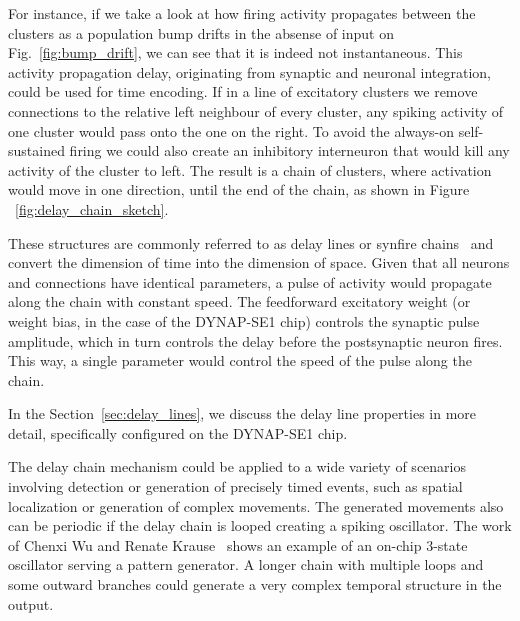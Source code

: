 For instance, if we take a look at how firing activity propagates between the clusters as a population bump drifts in the absense of input on Fig.~\ref{fig:bump_drift}, we can see that it is indeed not instantaneous. This activity propagation delay, originating from synaptic and neuronal integration, could be used for time encoding. If in a line of excitatory clusters we remove connections to the relative left neighbour of every cluster, any spiking activity of one cluster would pass onto the one on the right. To avoid the always-on self-sustained firing we could also create an inhibitory interneuron that would kill any activity of the cluster to left. The result is a chain of clusters, where activation would move in one direction, until the end of the chain, as shown in Figure ~\ref{fig:delay_chain_sketch}.

These structures are commonly referred to as delay lines or synfire chains~\cite{Abeles91} and convert the dimension of time into the dimension of space. Given that all neurons and connections have identical parameters, a pulse of activity would propagate along the chain with constant speed. The feedforward excitatory weight (or weight bias, in the case of the DYNAP-SE1 chip) controls the synaptic pulse amplitude, which in turn controls the delay before the postsynaptic neuron fires. This way, a single parameter would control the speed of the pulse along the chain.

In the Section~\ref{sec:delay_lines}, we discuss the delay line properties in more detail, specifically configured on the DYNAP-SE1 chip.




The delay chain mechanism could be applied to a wide variety of scenarios involving detection or generation of precisely timed events, such as spatial localization or generation of complex movements. The generated movements also can be periodic if the delay chain is looped creating a spiking oscillator. The work of Chenxi Wu and Renate Krause~\cite{Krause_etal21} shows an example of an on-chip 3-state oscillator serving a pattern generator. A longer chain with multiple loops and some outward branches could generate a very complex temporal structure in the output.

